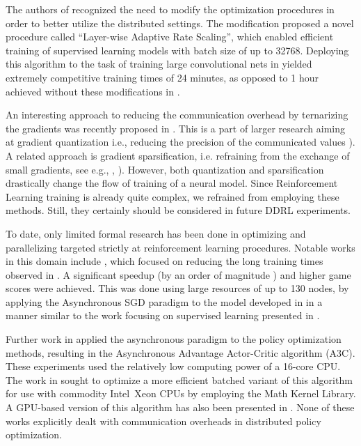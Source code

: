 \documentclass{llncs}
\begin{document}
The authors of \cite{LARS}  recognized the need to modify the optimization procedures in order to better utilize the distributed settings. The modification proposed a novel procedure called ``Layer-wise Adaptive Rate Scaling'', which enabled efficient training of supervised learning models with batch size of up to 32768. Deploying this algorithm to the task of training large convolutional nets in \cite{100_epoch_alexnet} yielded extremely competitive training times of 24 minutes, as opposed to 1 hour achieved without these modifications in \cite{fair_paper}.

An interesting approach to reducing the communication overhead by ternarizing the gradients was recently proposed in \cite{TernGrad}. This is a part of larger research aiming at gradient quantization i.e., reducing the precision of the communicated values \cite{quantization1} \cite{1BitSGD}). A related approach is gradient sparsification, i.e. refraining from the exchange of small gradients, see e.g., \cite{sparse_gradients1}, \cite{sparse_gradients2}). However, both  quantization and sparsification drastically change the flow of training of a neural model. Since Reinforcement Learning training is already quite complex, we refrained from employing these methods. Still, they certainly should be considered in future DDRL experiments. 

To date, only limited formal research has been done in optimizing and parallelizing targeted strictly at reinforcement learning procedures. Notable works in this domain include \cite{deepmind_gorilla}, which focused on reducing the long training times observed in \cite{deepmind_nature}. A significant speedup (by an order of magnitude \cite{deepmind_gorilla}) and higher game scores were achieved. This was done using large resources of up to 130 nodes, by applying the Asynchronous SGD paradigm to the model developed in \cite{deepmind_nature} in a manner similar to the work focusing on supervised learning presented in \cite{DistBelief}.

Further work in \cite{deepmind_a3c} applied the asynchronous paradigm to the policy optimization methods, resulting in the Asynchronous Advantage Actor-Critic algorithm (A3C). These experiments used the relatively low computing power of a 16-core CPU. The work in \cite{ba3c_paper} sought to optimize a more efficient batched variant of this algorithm for use with commodity Intel\textsuperscript{\textregistered}\ Xeon CPUs by employing the Math Kernel Library. A GPU-based version of this algorithm has also been presented in \cite{ga3c_2017}. None of these works explicitly dealt with communication overheads in distributed policy optimization.
\end{document}
